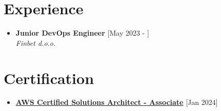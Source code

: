 \documentclass[a4paper]{moderncv}
\begin{document}
\makecvtitle



\section{Experience}

\begin{itemize}
	\item \textbf{Junior DevOps Engineer} \hfill [May 2023 - ]\\
	\textit{Finbet d.o.o.}
\end{itemize}	

\section{Certification}

\begin{itemize}
	\item \textbf{\href{https://aws.amazon.com/certification/certified-solutions-architect-associate/}{AWS Certified Solutions Architect - Associate}} \hfill [Jan 2024]%
	
	


	
\end{itemize}
\end{document}
